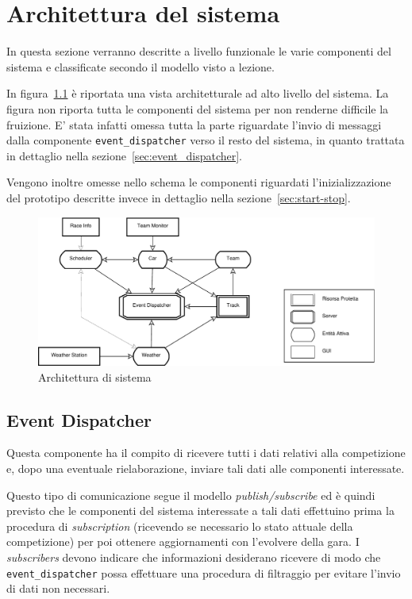\documentclass[a4paper]{report}
\begin{document}
\chapter{Architettura del sistema}
In questa sezione verranno descritte a livello funzionale le varie componenti del sistema e classificate secondo il modello visto a lezione.

In figura~\ref{fig:architettura} è riportata una vista architetturale ad alto livello del sistema. La figura non riporta tutta le componenti del sistema per non renderne difficile la fruizione. E' stata infatti omessa tutta la parte riguardate l'invio di messaggi dalla componente \texttt{event\_dispatcher} verso il resto del sistema, in quanto trattata in dettaglio nella sezione~\ref{sec:event_dispatcher}.

Vengono inoltre omesse nello schema le componenti riguardati l'inizializzazione del prototipo descritte invece in dettaglio nella sezione~\ref{sec:start-stop}.
\begin{landscape}
\begin{figure}
\includegraphics[height=.33\paperheight]{diagrammi/Arch}
\caption{Architettura di sistema}
\label{fig:architettura}
\end{figure}
\end{landscape}

\section{Event Dispatcher}
Questa componente ha il compito di ricevere tutti i dati relativi alla competizione e, dopo una eventuale rielaborazione, inviare tali dati alle componenti interessate.

Questo tipo di comunicazione segue il modello \textit{publish/subscribe} ed è quindi previsto che le componenti del sistema interessate a tali dati effettuino prima la procedura di \textit{subscription} (ricevendo se necessario lo stato attuale della competizione) per poi ottenere aggiornamenti con l'evolvere della gara. I \textit{subscribers} devono indicare che informazioni desiderano ricevere di modo che \texttt{event\_dispatcher} possa effettuare una procedura di filtraggio per evitare l'invio di dati non necessari.
\end{document}

